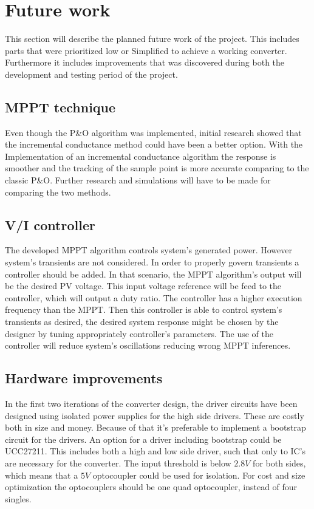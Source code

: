 \section{Future work}
This section will describe the planned future work of the project. This includes parts that were prioritized low or Simplified to achieve a working converter. Furthermore it includes improvements that was discovered during both the development and testing period of the project.


\subsection{MPPT technique}
Even though the P\&O algorithm was implemented, initial research showed that the incremental conductance method could have been a better option. With the Implementation of an incremental conductance algorithm the response is smoother and the tracking of the sample point is more accurate comparing to the classic P\&O.   Further research and simulations will have to be made for comparing the two methods. 


\subsection{V/I controller}
The developed MPPT algorithm controls system's generated power. However system's transients are not considered. In order to properly govern transients a controller should be added. In that scenario, the MPPT algorithm's output will be the desired PV voltage. This input voltage reference will be feed to the controller, which will output a duty ratio. The controller has a higher execution frequency than the MPPT. Then this controller is able to control system's transients as desired, the desired system response might be chosen by the designer by tuning appropriately controller's parameters. The use of the controller will reduce system's oscillations reducing wrong MPPT inferences. 


\subsection{Hardware improvements}
In the first two iterations of the converter design, the driver circuits have been designed using isolated power supplies for the high side drivers. These are costly both in size and money. Because of that it's preferable to implement a bootstrap circuit for the drivers. An option for a driver including bootstrap could be UCC27211\cite{boot_driver_datasheet}. This includes both a high and low side driver, such that only to IC's are necessary for the converter. The input threshold is below $2.8V$ for both sides, which means that a $5V$ optocoupler could be used for isolation. For cost and size optimization the optocouplers should be one quad optocoupler, instead of four singles. 
 
